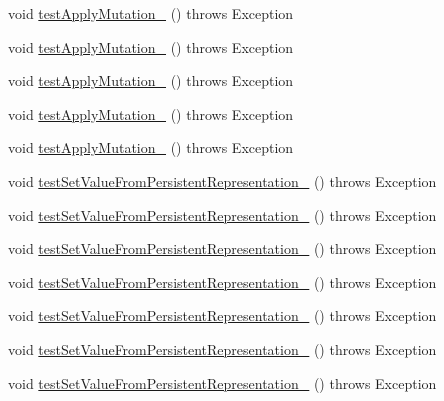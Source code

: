 \begin{DoxyCompactItemize}
\item 
void \hyperlink{classorg_1_1jgap_1_1impl_1_1_boolean_gene_test_aa83d5a63c465c5045663146a576ea507}{test\-Apply\-Mutation\-\_} ()  throws Exception 
\item 
void \hyperlink{classorg_1_1jgap_1_1impl_1_1_boolean_gene_test_a8c25ad3196113f337a82c7258d5d9a12}{test\-Apply\-Mutation\-\_} ()  throws Exception 
\item 
void \hyperlink{classorg_1_1jgap_1_1impl_1_1_boolean_gene_test_a88a259c13278d12557a365fa28b6592e}{test\-Apply\-Mutation\-\_} ()  throws Exception 
\item 
void \hyperlink{classorg_1_1jgap_1_1impl_1_1_boolean_gene_test_a07c5ee01f343aa281e83ff402392ad91}{test\-Apply\-Mutation\-\_} ()  throws Exception 
\item 
void \hyperlink{classorg_1_1jgap_1_1impl_1_1_boolean_gene_test_a9b26fa9b346a57530e71ba499755d185}{test\-Apply\-Mutation\-\_} ()  throws Exception 
\item 
void \hyperlink{classorg_1_1jgap_1_1impl_1_1_boolean_gene_test_a964eb8372a769a63d7ccebe838f95955}{test\-Set\-Value\-From\-Persistent\-Representation\-\_} ()  throws Exception 
\item 
void \hyperlink{classorg_1_1jgap_1_1impl_1_1_boolean_gene_test_a74a3edfd1a7bd8535386b86e1e9a136e}{test\-Set\-Value\-From\-Persistent\-Representation\-\_} ()  throws Exception 
\item 
void \hyperlink{classorg_1_1jgap_1_1impl_1_1_boolean_gene_test_a4d5319f5916e1663ce805e558204a7ce}{test\-Set\-Value\-From\-Persistent\-Representation\-\_} ()  throws Exception 
\item 
void \hyperlink{classorg_1_1jgap_1_1impl_1_1_boolean_gene_test_a328bc133cf71b9d5ead453976301aa33}{test\-Set\-Value\-From\-Persistent\-Representation\-\_} ()  throws Exception 
\item 
void \hyperlink{classorg_1_1jgap_1_1impl_1_1_boolean_gene_test_aa917e5a36374ee0281462c79b82d6feb}{test\-Set\-Value\-From\-Persistent\-Representation\-\_} ()  throws Exception 
\item 
void \hyperlink{classorg_1_1jgap_1_1impl_1_1_boolean_gene_test_a647018c654df2ba53930c522fe8762e4}{test\-Set\-Value\-From\-Persistent\-Representation\-\_} ()  throws Exception 
\item 
void \hyperlink{classorg_1_1jgap_1_1impl_1_1_boolean_gene_test_afaa48a20c2c4b06a8e66ffe5926e5669}{test\-Set\-Value\-From\-Persistent\-Representation\-\_} ()  throws Exception 
\item 

\end{DoxyCompactItemize}
